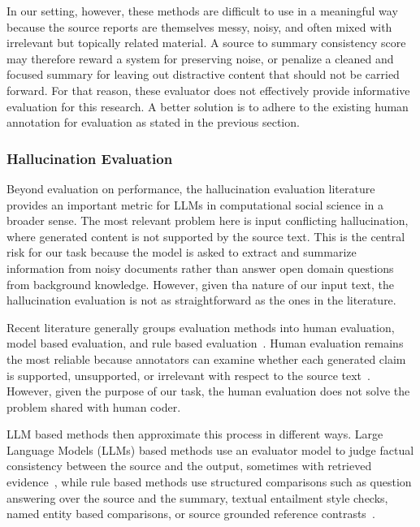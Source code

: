 \documentclass{article}
\begin{document}
In our setting, however, these methods are difficult to use in a meaningful way because the source reports are themselves messy, noisy, and often mixed with irrelevant but topically related material. A source to summary consistency score may therefore reward a system for preserving noise, or penalize a cleaned and focused summary for leaving out distractive content that should not be carried forward. For that reason, these evaluator does not effectively provide informative evaluation for this research. A better solution is to adhere to the existing human annotation for evaluation as stated in the previous section.

\subsubsection{Hallucination Evaluation
}\label{hallucination-evaluation-literature}

Beyond evaluation on performance, the hallucination evaluation literature provides an important metric for LLMs in computational social science in a broader sense. The most relevant problem here is input conflicting hallucination, where generated content is not supported by the source text. This is the central risk for our task because the model is asked to extract and summarize information from noisy documents rather than answer open domain questions from background knowledge. However, given tha nature of our input text, the hallucination evaluation is not as straightforward as the ones in the literature.

Recent literature generally groups evaluation methods into human evaluation, model based evaluation, and rule based evaluation~\cite{Zhang_etal2025}. Human evaluation remains the most reliable because annotators can examine whether each generated claim is supported, unsupported, or irrelevant with respect to the source text~\cite{Min_etal2023}. However, given the purpose of our task, the human evaluation does not solve the problem shared with human coder.

LLM based methods then approximate this process in different ways. Large Language Models (LLMs) based methods use an evaluator model to judge factual consistency between the source and the output, sometimes with retrieved evidence~\cite{Liu_etal2023}, while rule based methods use structured comparisons such as question answering over the source and the summary, textual entailment style checks, named entity based comparisons, or source grounded reference contrasts~\cite{Laban_etal2022,Lee_etal2022}.
\end{document}
